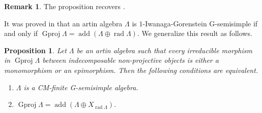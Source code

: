 \documentclass[12pt]{amsart}
\numberwithin{equation}{subsection}
\theoremstyle{plain}
\newtheorem{proposition}[theorem]{Proposition}
\theoremstyle{definition}
\newtheorem{remark}[theorem]{Remark}
\newcommand{\rad}{\operatorname{rad}}
\newcommand{\add}{\operatorname{add}}
\newcommand{\Gproj}{\operatorname{Gproj}}
\renewcommand{\L}{\Lambda}
\begin{document}
\begin{remark}
The proposition recovers \cite[Lemma 3.6]{Hafezi-Bahlekeh_2024}.
\end{remark}




It was proved in \cite[Proposition 3.13]{Hafezi-Bahlekeh_2024} that an artin algebra $\L$ is $1$-Iwanaga-Gorenstein G-semisimple if and only if $\Gproj\L = \add (\L \oplus \rad\L)$. 
We generalize this result as follows.




\begin{proposition}\label{claim_35}
Let $\L$ be an artin algebra such that every irreducible morphism in $\Gproj\L$ between indecomposable non-projective objects is either a monomorphism or an epimorphism.
Then the following conditions are equivalent.
\begin{enumerate}
\item $\L$ is a CM-finite G-semisimple algebra.
\item $\Gproj\L = \add(\L \oplus X_{\rad\L})$.
\end{enumerate}
\end{proposition}
\end{document}

